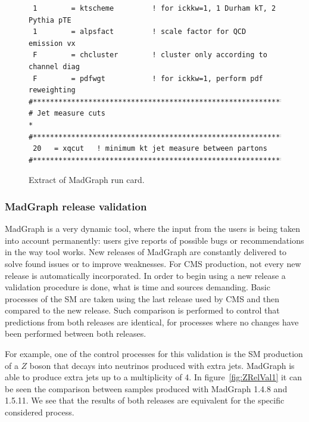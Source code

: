 \begin{itemize}
\begin{figure}[!Hhtbp]
\begin{center}
\begin{minipage}[c]{0.7\textwidth}
\begin{verbatim}
 1        = ktscheme         ! for ickkw=1, 1 Durham kT, 2 Pythia pTE
 1        = alpsfact         ! scale factor for QCD emission vx
 F        = chcluster        ! cluster only according to channel diag
 F        = pdfwgt           ! for ickkw=1, perform pdf reweighting
#*********************************************************************
# Jet measure cuts                                                   *
#*********************************************************************
 20   = xqcut   ! minimum kt jet measure between partons
#*********************************************************************
\end{verbatim}
\normalsize
        \end{minipage}
          \caption{Extract of MadGraph run card.}
          \label{fig:RunCard}
      \end{center}
    \end{figure}

\end{itemize}


\subsubsection{MadGraph release validation}

MadGraph is a very dynamic tool, where the input from the users is being taken into account permanently: users give reports of possible bugs or recommendations in the way tool works. New releases of MadGraph are constantly delivered to solve found issues or to improve weaknesses. For CMS production, not every new release is automatically incorporated. In order to begin using a new release a validation procedure is done, what is time and sources demanding. Basic processes of the SM are taken using the last release used by CMS and then compared to the new release. Such comparison is performed to control that predictions from both releases are identical, for processes where no changes have been performed between both releases. 

For example, one of the control processes for this validation is the SM production of a $Z$ boson that decays into neutrinos produced with extra jets. MadGraph is able to produce extra jets up to a multiplicity of 4. In figure~\ref{fig:ZRelVal1} it can be seen the comparison between samples produced with MadGraph 1.4.8 and 1.5.11. We see that the results of both releases are equivalent for the specific considered process.

